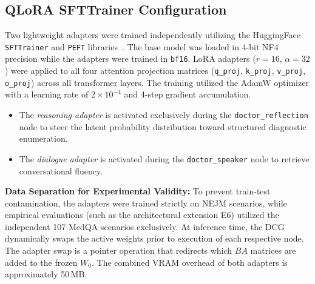 \subsection{QLoRA SFTTrainer Configuration}
Two lightweight adapters were trained independently utilizing the HuggingFace \texttt{SFTTrainer} and \texttt{PEFT} libraries~\cite{wolf2020huggingfaces}. The base model was loaded in 4-bit NF4 precision while the adapters were trained in \texttt{bf16}. LoRA adapters ($r=16$, $\alpha=32$) were applied to all four attention projection matrices (\texttt{q\_proj}, \texttt{k\_proj}, \texttt{v\_proj}, \texttt{o\_proj}) across all transformer layers. The training utilized the AdamW optimizer with a learning rate of $2 \times 10^{-4}$ and 4-step gradient accumulation.

\begin{itemize}
    \item The \textit{reasoning adapter} is activated exclusively during the \texttt{doctor\_reflection} node to steer the latent probability distribution toward structured diagnostic enumeration.
    \item The \textit{dialogue adapter} is activated during the \texttt{doctor\_speaker} node to retrieve conversational fluency.
\end{itemize}

\textbf{Data Separation for Experimental Validity:} To prevent train-test contamination, the adapters were trained strictly on NEJM scenarios, while empirical evaluations (such as the architectural extension E6) utilized the independent 107 MedQA scenarios exclusively. At inference time, the DCG dynamically swaps the active weights prior to execution of each respective node. The adapter swap is a pointer operation that redirects which $BA$ matrices are added to the frozen $W_0$. The combined VRAM overhead of both adapters is approximately 50\,MB.


